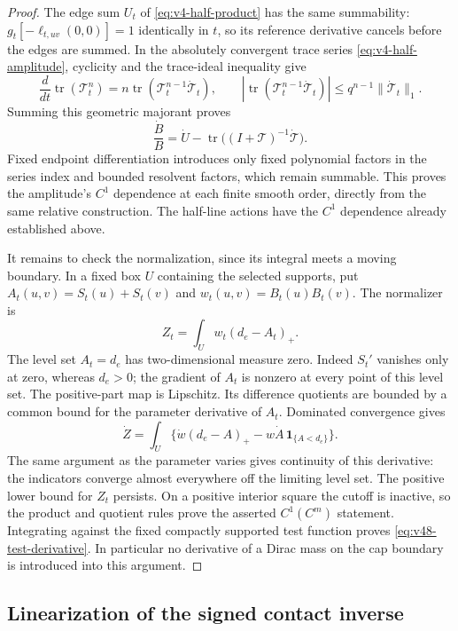 \begin{proof}
The edge sum $U_t$ of \eqref{eq:v4-half-product} has the same
summability: $g_t[-\ell_{t,uv}(0,0)]=1$ identically in $t$, so its
reference derivative cancels before the edges are summed.  In the
absolutely convergent trace series \eqref{eq:v4-half-amplitude},
cyclicity and the trace-ideal inequality give
\[
 \frac{d}{dt}\operatorname{tr}(\mathcal T_t^n)
    =n\operatorname{tr}(\mathcal T_t^{n-1}\dot{\mathcal T}_t),
 \qquad
 |\operatorname{tr}(\mathcal T_t^{n-1}\dot{\mathcal T}_t)|
     \le q^{n-1}\|\dot{\mathcal T}_t\|_1.
\]
Summing this geometric majorant proves
\begin{equation}\label{eq:v49-amplitude-derivative}
 \frac{\dot B}{B}=\dot U-
       \operatorname{tr}\bigl((I+\mathcal T)^{-1}
                                      \dot{\mathcal T}\bigr).
\end{equation}
Fixed endpoint differentiation introduces only fixed polynomial factors
in the series index and bounded resolvent factors, which remain
summable.  This proves the amplitude's $C^1$ dependence at each finite
smooth order, directly from the same relative construction.  The
half-line actions have the $C^1$ dependence already established above.

It remains to check the normalization, since its integral meets a
moving boundary.  In a fixed box $U$ containing the selected supports,
put $A_t(u,v)=S_t(u)+S_t(v)$ and $w_t(u,v)=B_t(u)B_t(v)$.
The normalizer is
\[
                  Z_t=\int_U w_t(d_e-A_t)_+.
\]
The level set $A_t=d_e$ has two-dimensional measure zero.  Indeed
$S_t'$ vanishes only at zero, whereas $d_e>0$; the gradient of $A_t$
is nonzero at every point of this level set.  The positive-part map is
Lipschitz.  Its difference quotients are bounded by a common bound for
the parameter derivative of $A_t$.  Dominated convergence gives
\[
 \dot Z=\int_U\{\dot w(d_e-A)_+-w\dot A\,
                                     \mathbf1_{\{A<d_e\}}\}.
\]
The same argument as the parameter varies gives continuity of this
derivative: the indicators converge almost everywhere off the limiting
level set.  The positive lower bound for $Z_t$ persists.  On a positive
interior square the cutoff is inactive, so the product and quotient
rules prove the asserted $C^1(C^m)$ statement.  Integrating against the
fixed compactly supported test function proves
\eqref{eq:v48-test-derivative}.  In particular no derivative of a Dirac
mass on the cap boundary is introduced into this argument.
\end{proof}

\subsection{Linearization of the signed contact inverse}


